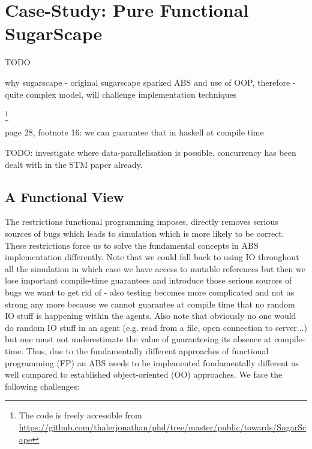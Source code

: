 \section{Case-Study: Pure Functional SugarScape}
\label{sec:case_study}

TODO

why sugarscape
- original sugarscape sparked ABS and use of OOP, therefore 
- quite complex model, will challenge implementation techniques

\footnote{The code is freely accessible from \url{https://github.com/thalerjonathan/phd/tree/master/public/towards/SugarScape}}

\cite{weaver_replicating_nodate}

page 28, footnote 16: we can guarantee that in haskell at compile time

TODO: investigate where data-parallelisation is possible. concurrency has been dealt with in the STM paper already.

\subsection{A Functional View}
The restrictions functional programming imposes, directly removes serious sources of bugs which leads to simulation which is more likely to be correct. These restrictions force us to solve the fundamental concepts in ABS implementation differently. Note that we could fall back to using IO throughout all the simulation in which case we have access to mutable references but then we lose important compile-time guarantees and introduce those serious sources of bugs we want to get rid of - also testing becomes more complicated and not as strong any more because we cannot guarantee at compile time that no random IO stuff is happening within the agents. Also note that obviously no one would do random IO stuff in an agent (e.g. read from a file, open connection to server...) but one must not underestimate the value of guaranteeing its absence at compile-time. Thus, due to the fundamentally different approaches of functional programming (FP) an ABS needs to be implemented fundamentally different as well compared to established object-oriented (OO) approaches. We face the following challenges:

